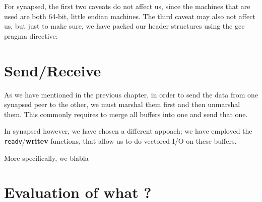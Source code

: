 For synapsed, the first two caveats do not affect us, since the machines that 
are used are both 64-bit, little endian machines. The third caveat may also not 
affect us, but just to make sure, we have packed our header structures using 
the gcc pragma directive:


\section{Send/Receive}

As we have mentioned in the previous chapter, in order to send the data from 
one synapsed peer to the other, we must marshal them first and then unmarshal 
them. This commonly requires to merge all buffers into one and send that one.  

In synapsed however, we have chosen a different appoach; we have employed the 
\texttt{readv}/\textbf{writev} functions, that allow us to do vectored I/O on 
these buffers.

More specifically, we blabla

\section{Evaluation of what ?}
